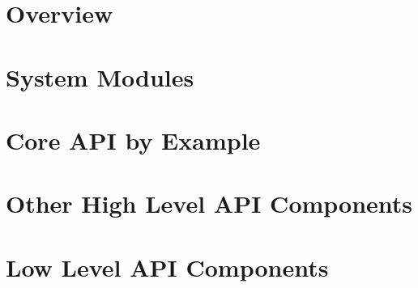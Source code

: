 \section{Overview}\label{sec:ui-overview}

\section{System Modules}\label{sec:sysmod}

\section{Core API by Example}\label{sec:api-example}

\section{Other High Level API Components}\label{sec:api-high}

\section{Low Level API Components}\label{sec:api-low}

